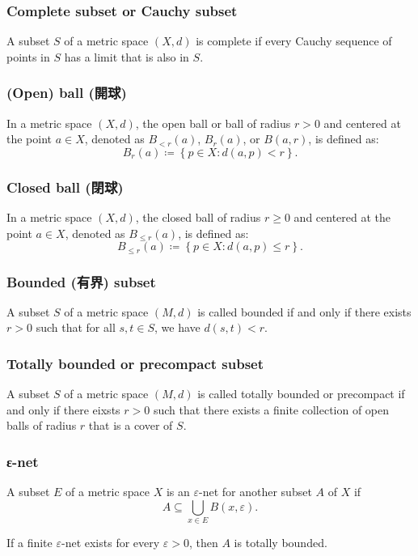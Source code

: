 \documentclass[a4paper,12pt]{article}
\begin{document}
\subsubsection{Complete subset or Cauchy subset}
A subset $S$ of a metric space $(X,d)$ is complete if every Cauchy sequence of points in $S$ has a limit that is also in $S$.
\subsubsection{(Open) ball (開球)}
In a metric space $(X,d)$, the open ball or ball of radius $r>0$ and centered at the point $a\in X$, denoted as $B_{<r}(a)$, $B_{r}(a)$, or $B(a,r)$, is defined as:
\[B_{r}(a)\coloneq\left\{p\in X\colon  d(a,p)<r\right\}.\]
\subsubsection{Closed ball (閉球)}
In a metric space $(X,d)$, the closed ball of radius $r\geq 0$ and centered at the point $a\in X$, denoted as $B_{\leq r}(a)$, is defined as:
\[B_{\leq r}(a)\coloneq\left\{p\in X\colon  d(a,p)\leq r\right\}.\]
\subsubsection{Bounded (有界) subset}
A subset $S$ of a metric space $(M, d)$ is called bounded if and only if there exists $r > 0$ such that for all $s,t\in S$, we have $d(s, t) < r$.
\subsubsection{Totally bounded or precompact subset}
A subset $S$ of a metric space $(M, d)$ is called totally bounded or precompact if and only if there eixsts $r>0$ such that there exists a finite collection of open balls of radius $r$ that is a cover of $S$.
\subsubsection{ε-net}
A subset $E$ of a metric space $X$ is an $\varepsilon$-net for another subset $A$ of $X$ if
\[A\subseteq\bigcup_{x\in E}B(x,\varepsilon).\]

If a finite $\varepsilon$-net exists for every $\varepsilon>0$, then $A$ is totally bounded.
\end{document}
